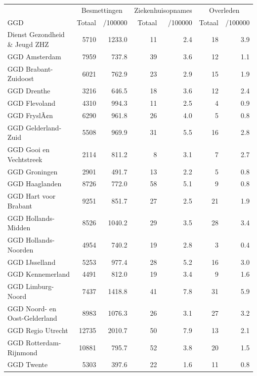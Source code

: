 \documentclass[
  english,
  man,floatsintext]{apa6}
\begin{document}
\begin{table}
\centering\begingroup\fontsize{10}{12}\selectfont

\begin{threeparttable}
\begin{tabular}{lrrrrrr}
\toprule
\multicolumn{1}{c}{ } & \multicolumn{2}{c}{Besmettingen} & \multicolumn{2}{c}{Ziekenhuisopnames} & \multicolumn{2}{c}{Overleden} \\
\cmidrule(l{3pt}r{3pt}){2-3} \cmidrule(l{3pt}r{3pt}){4-5} \cmidrule(l{3pt}r{3pt}){6-7}
GGD & Totaal & /100000 & Totaal & /100000 & Totaal & /100000\\
\midrule
Dienst Gezondheid \& Jeugd ZHZ & 5710 & 1233.0 & 11 & 2.4 & 18 & 3.9\\
GGD Amsterdam & 7959 & 737.8 & 39 & 3.6 & 12 & 1.1\\
GGD Brabant-Zuidoost & 6021 & 762.9 & 23 & 2.9 & 15 & 1.9\\
GGD Drenthe & 3216 & 646.5 & 18 & 3.6 & 12 & 2.4\\
GGD Flevoland & 4310 & 994.3 & 11 & 2.5 & 4 & 0.9\\
GGD FryslÃ¢n & 6290 & 961.8 & 26 & 4.0 & 5 & 0.8\\
GGD Gelderland-Zuid & 5508 & 969.9 & 31 & 5.5 & 16 & 2.8\\
GGD Gooi en Vechtstreek & 2114 & 811.2 & 8 & 3.1 & 7 & 2.7\\
GGD Groningen & 2901 & 491.7 & 13 & 2.2 & 5 & 0.8\\
GGD Haaglanden & 8726 & 772.0 & 58 & 5.1 & 9 & 0.8\\
GGD Hart voor Brabant & 9251 & 851.7 & 27 & 2.5 & 21 & 1.9\\
GGD Hollands-Midden & 8526 & 1040.2 & 29 & 3.5 & 28 & 3.4\\
GGD Hollands-Noorden & 4954 & 740.2 & 19 & 2.8 & 3 & 0.4\\
GGD IJsselland & 5253 & 977.4 & 28 & 5.2 & 16 & 3.0\\
GGD Kennemerland & 4491 & 812.0 & 19 & 3.4 & 9 & 1.6\\
GGD Limburg-Noord & 7437 & 1418.8 & 41 & 7.8 & 31 & 5.9\\
GGD Noord- en Oost-Gelderland & 8983 & 1076.3 & 26 & 3.1 & 27 & 3.2\\
GGD Regio Utrecht & 12735 & 2010.7 & 50 & 7.9 & 13 & 2.1\\
GGD Rotterdam-Rijnmond & 10881 & 795.7 & 52 & 3.8 & 20 & 1.5\\
GGD Twente & 5303 & 397.6 & 22 & 1.6 & 11 & 0.8\\

\end{tabular}
\end{threeparttable}
\end{table}
\end{document}

